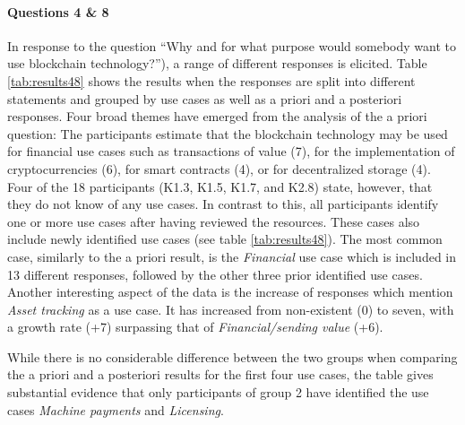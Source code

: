\paragraph{Questions 4 \& 8} In response to the question \enquote{Why and for what purpose would somebody want to use blockchain technology?}), a range of different responses is elicited. Table \ref{tab:results48} shows the results when the responses are split into different statements and grouped by use cases as well as a priori and a posteriori responses.
Four broad themes have emerged from the analysis of the a priori question: The participants estimate that the blockchain technology may be used for financial use cases such as transactions of value (7), for the implementation of cryptocurrencies (6), for smart contracts (4), or for decentralized storage (4). Four of the 18 participants (K1.3, K1.5, K1.7, and K2.8) state, however, that they do not know of any use cases. In contrast to this, all participants identify one or more use cases after having reviewed the resources. These cases also include newly identified use cases (see table \ref{tab:results48}). The most common case, similarly to the a priori result, is the \textit{Financial} use case which is included in 13 different responses, followed by the other three prior identified use cases.
Another interesting aspect of the data is the increase of responses which mention \textit{Asset tracking} as a use case. It has increased from non-existent (0) to seven, with a growth rate (+7) surpassing that of \textit{Financial/sending value} (+6).

While there is no considerable difference between the two groups when comparing the a priori and a posteriori results for the first four use cases, the table gives substantial evidence that only participants of group 2 have identified the use cases \textit{Machine payments} and \textit{Licensing}.

